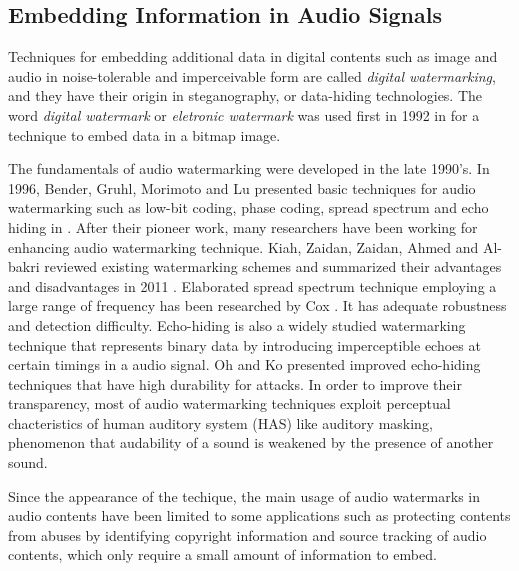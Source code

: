 \subsection{Embedding Information in Audio Signals}
Techniques for embedding additional data in digital contents such as image and audio in noise-tolerable and imperceivable form are called {\it digital watermarking}, and they have their origin in steganography, or data-hiding technologies.
The word {\it digital watermark} or {\it eletronic watermark} was used first in 1992 in \cite{tirkel1993electronic} for a technique to embed data in a bitmap image.

The fundamentals of audio watermarking were developed in the late 1990's.
In 1996, Bender, Gruhl, Morimoto and Lu presented basic techniques for audio watermarking such as low-bit coding, phase coding, spread spectrum and echo hiding in \cite{bender1996techniques}.
After their pioneer work, many researchers have been working for enhancing audio watermarking technique.
Kiah, Zaidan, Zaidan, Ahmed and Al-bakri reviewed existing watermarking schemes and summarized their advantages and disadvantages in 2011 \cite{mat2011review}.
Elaborated spread spectrum technique employing a large range of frequency has been researched by Cox \cite{cox1997secure,cox2001digital}. It has adequate robustness and detection difficulty.
Echo-hiding is also a widely studied watermarking technique that represents binary data by introducing imperceptible echoes at certain timings in a audio signal. Oh \cite{oh2001new} and Ko \cite{ko2005time} presented improved echo-hiding techniques that have high durability for attacks.
In order to improve their transparency, most of audio watermarking techniques exploit perceptual chacteristics of human auditory system (HAS) like auditory masking, phenomenon that audability of a sound is weakened by the presence of another sound.

Since the appearance of the techique, the main usage of audio watermarks in audio contents have been limited to some applications such as protecting contents from abuses by identifying copyright information and source tracking of audio contents, which only require a small amount of information to embed.

